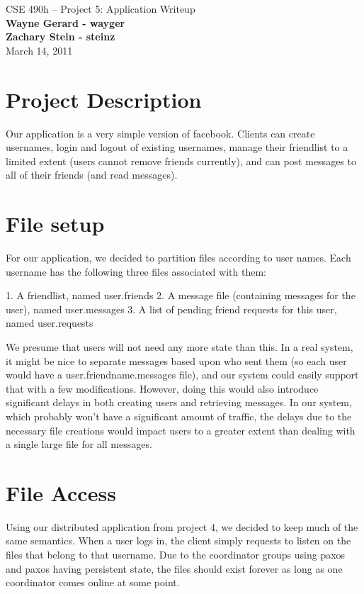 \documentclass[11pt]{article}
\begin{document}
\begin{center}
{\large CSE 490h -- Project 5: Application Writeup} \\
\textbf{Wayne Gerard - wayger} \\
\textbf{Zachary Stein - steinz} \\
March 14, 2011
\end{center}

\section{Project Description}

Our application is a very simple version of facebook. Clients can create usernames, login and logout of existing usernames, manage their friendlist to a limited extent (users cannot remove friends currently), and can post messages to all of their friends (and read messages).


\section{File setup}

For our application, we decided to partition files according to user names. Each username has the following three files associated with them:

1. A friendlist, named user.friends
2. A message file (containing messages for the user), named user.messages
3. A list of pending friend requests for this user, named user.requests

We presume that users will not need any more state than this. In a real system, it might be nice to separate messages based upon who sent them (so each user would have a user.friendname.messages file), and our system could easily support that with a few modifications. However, doing this would also introduce significant delays in both creating users and retrieving messages. In our system, which probably won't have a significant amount of traffic, the delays due to the necessary file creations would impact users to a greater extent than dealing with a single large file for all messages.

\section{File Access}

Using our distributed application from project 4, we decided to keep much of the same semantics. When a user logs in, the client simply requests to listen on the files that belong to that username. Due to the coordinator groups using paxos and paxos having persistent state, the files should exist forever as long as one coordinator comes online at some point.
\end{document}
